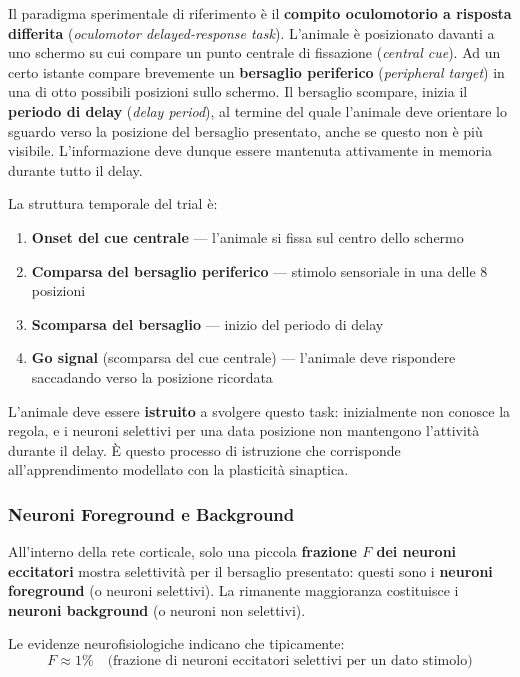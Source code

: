 Il paradigma sperimentale di riferimento è il \textbf{compito oculomotorio a risposta differita} (\textit{oculomotor delayed-response task}). L'animale è posizionato davanti a uno schermo su cui compare un punto centrale di fissazione (\textit{central cue}). Ad un certo istante compare brevemente un \textbf{bersaglio periferico} (\textit{peripheral target}) in una di otto possibili posizioni sullo schermo. Il bersaglio scompare, inizia il \textbf{periodo di delay} (\textit{delay period}), al termine del quale l'animale deve orientare lo sguardo verso la posizione del bersaglio presentato, anche se questo non è più visibile. L'informazione deve dunque essere mantenuta attivamente in memoria durante tutto il delay.

La struttura temporale del trial è:
\begin{enumerate}
    \item \textbf{Onset del cue centrale} — l'animale si fissa sul centro dello schermo
    \item \textbf{Comparsa del bersaglio periferico} — stimolo sensoriale in una delle 8 posizioni
    \item \textbf{Scomparsa del bersaglio} — inizio del periodo di delay
    \item \textbf{Go signal} (scomparsa del cue centrale) — l'animale deve rispondere saccadando verso la posizione ricordata
\end{enumerate}

L'animale deve essere \textbf{istruito} a svolgere questo task: inizialmente non conosce la regola, e i neuroni selettivi per una data posizione non mantengono l'attività durante il delay. È questo processo di istruzione che corrisponde all'apprendimento modellato con la plasticità sinaptica.

\subsubsection{Neuroni Foreground e Background}

All'interno della rete corticale, solo una piccola \textbf{frazione $F$ dei neuroni eccitatori} mostra selettività per il bersaglio presentato: questi sono i \textbf{neuroni foreground} (o neuroni selettivi). La rimanente maggioranza costituisce i \textbf{neuroni background} (o neuroni non selettivi).

Le evidenze neurofisiologiche indicano che tipicamente:
\begin{equation}
F \approx 1\% \quad \text{(frazione di neuroni eccitatori selettivi per un dato stimolo)}
\end{equation}

